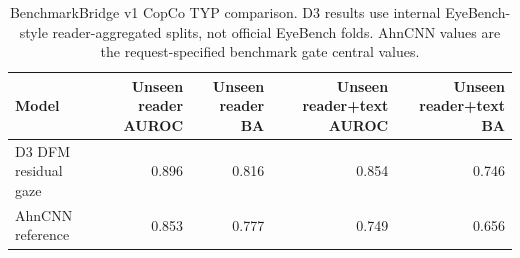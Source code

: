 \begin{table}[t]
\centering
\caption{BenchmarkBridge v1 CopCo TYP comparison. D3 results use internal EyeBench-style
reader-aggregated splits, not official EyeBench folds. AhnCNN values are the
request-specified benchmark gate central values.}
\label{tab:benchmark-bridge-typ}
\begin{tabular}{lrrrr}
\toprule
Model & Unseen reader AUROC & Unseen reader BA & Unseen reader+text AUROC & Unseen reader+text BA \\
\midrule
D3 DFM residual gaze & 0.896 & 0.816 & 0.854 & 0.746 \\
AhnCNN reference & 0.853 & 0.777 & 0.749 & 0.656 \\
\bottomrule
\end{tabular}
\end{table}

